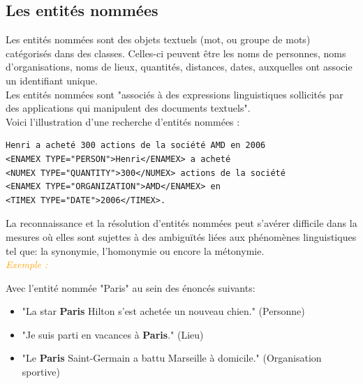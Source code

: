 \documentclass[a4paper, 11pt]{report}
\newenvironment{exemple}
    {
    \textit{\textcolor{orange}{
    Exemple : \\}}
    }
    {~\\
    }
\begin{document}
\subsection{Les entités nommées}
Les entités nommées sont des objets textuels (mot, ou groupe de mots) catégorisés dans des classes. Celles-ci peuvent être les noms de personnes, noms d'organisations, noms de lieux, quantités, distances, dates, auxquelles ont associe un identifiant unique.\\
Les entités nommées sont "associés à des expressions linguistiques sollicités par des applications qui manipulent des documents textuels".\\
Voici l'illustration d'une recherche d'entités nommées :
\begin{verbatim}
Henri a acheté 300 actions de la société AMD en 2006
<ENAMEX TYPE="PERSON">Henri</ENAMEX> a acheté 
<NUMEX TYPE="QUANTITY">300</NUMEX> actions de la société 
<ENAMEX TYPE="ORGANIZATION">AMD</ENAMEX> en 
<TIMEX TYPE="DATE">2006</TIMEX>.
\end{verbatim}
La reconnaissance et la résolution d'entités nommées peut s'avérer difficile dans la mesures où elles sont sujettes à des ambiguïtés liées aux phénomènes linguistiques tel que: la synonymie, l'homonymie ou encore la métonymie.\\
\begin{exemple}
Avec l’entité nommée "Paris" au sein des énoncés suivants:
\begin{itemize}
\item "La star \textbf{Paris} Hilton s'est achetée un nouveau chien." (Personne)
\item "Je suis parti en vacances à \textbf{Paris}." (Lieu)
\item "Le \textbf{Paris} Saint-Germain a battu Marseille à domicile." (Organisation sportive)
\end{itemize}
\end{exemple}
\end{document}
